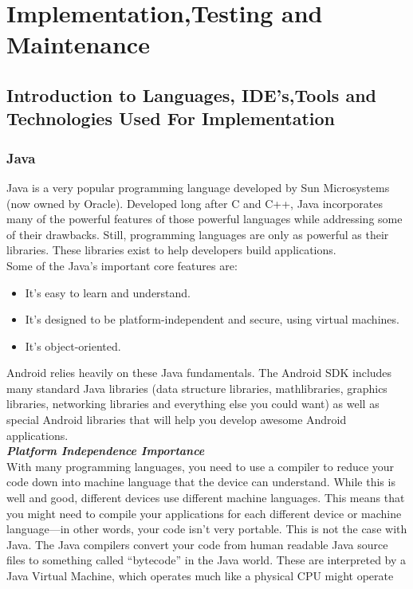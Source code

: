 \chapter{Implementation,Testing and Maintenance}
\section{Introduction to Languages, IDE's,Tools and Technologies Used For Implementation}
\subsection{Java}
Java is a very popular
programming language developed by Sun Microsystems (now owned by
Oracle). Developed long after C and C++, Java incorporates many of the
powerful features of those powerful languages while addressing some of
their drawbacks. Still, programming languages are only as powerful as
their libraries. These libraries exist to help developers build applications.\\
Some of the Java’s important core features are:\\
\begin{itemize}
\item It’s easy to learn and understand.
\item It’s designed to be platform-independent and secure, using virtual machines.
\item It’s object-oriented.
\end{itemize}
Android relies heavily on these Java fundamentals. The Android SDK
includes many standard Java libraries (data structure libraries, mathlibraries, graphics libraries, networking libraries and everything else you could want) as well as special Android libraries that will help you develop awesome Android applications.\\
\textbf{\emph{Platform Independence Importance}}\\
With many programming languages, you need to use a compiler to reduce
your code down into machine language that the device can understand.
While this is well and good, different devices use different machine
languages. This means that you might need to compile your applications
for each different device or machine language—in other words, your code
isn’t very portable. This is not the case with Java. The Java compilers
convert your code from human readable Java source files to something
called “bytecode” in the Java world. These are interpreted by a Java
Virtual Machine, which operates much like a physical CPU might operate
